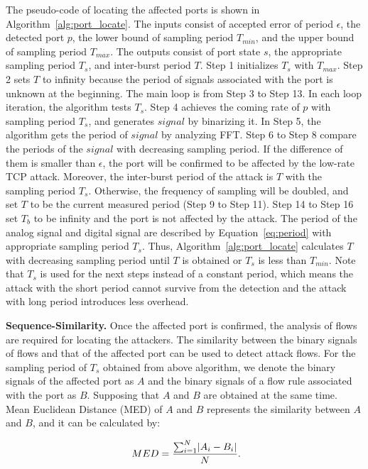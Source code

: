 The pseudo-code of locating the affected ports is shown in Algorithm~\ref{alg:port_locate}. The inputs consist of accepted error of period $\epsilon$, the detected port $p$, the lower bound of sampling period $T_{min}$, and the upper bound of sampling period $T_{max}$. The outputs consist of port state $s$, the appropriate sampling period $T_s$, and inter-burst period $T$. Step 1 initializes $T_s$ with $T_{max}$. Step 2 sets $T$ to infinity because the period of signals associated with the port is unknown at the beginning. The main loop is from Step 3 to Step 13. In each loop iteration, the algorithm tests $T_s$. Step 4 achieves the coming rate of $p$ with sampling period $T_s$, and generates $signal$ by binarizing it. In Step 5, the algorithm gets the period of $signal$ by analyzing FFT. Step 6 to Step 8 compare the periods of the $signal$ with decreasing sampling period. If the difference of them is smaller than $\epsilon$, the port will be confirmed to be affected by the low-rate TCP attack. Moreover, the inter-burst period of the attack is $T$ with the sampling period $T_s$. Otherwise, the frequency of sampling will be doubled, and set $T$ to be the current measured period (Step 9 to Step 11). Step 14 to Step 16 set $T_b$ to be infinity and the port is not affected by the attack. The period of the analog signal and digital signal are described by Equation~\ref{eq:period} with appropriate sampling period $T_s$. Thus, Algorithm~\ref{alg:port_locate} calculates $T$ with decreasing sampling period until $T$ is obtained or $T_s$ is less than $T_{min}$. Note that $T_s$ is used for the next steps instead of a constant period, which means the attack with the short period cannot survive from the detection and the attack with long period introduces less overhead.


\noindent \textbf{Sequence-Similarity.} Once the affected port is confirmed, the analysis of flows are required for locating the attackers. The similarity between the binary signals of flows and that of the affected port can be used to detect attack flows. For the sampling period of $T_s$ obtained from above algorithm, we denote the binary signals of the affected port as $A$ and the binary signals of a flow rule associated with the port as $B$. Supposing that $A$ and $B$ are obtained at the same time. Mean Euclidean Distance (MED) of $A$ and $B$ represents the similarity between $ A $ and $B$, and it can be calculated by:

\vspace{-0.05in}
\begin{equation}\label{eq:euclidean_distance}
\ MED=\frac{\sum_{i=1}^{N}\lvert A_{i} - B_{i}\rvert}{N}.
\vspace{-0.05in}
\end{equation}

